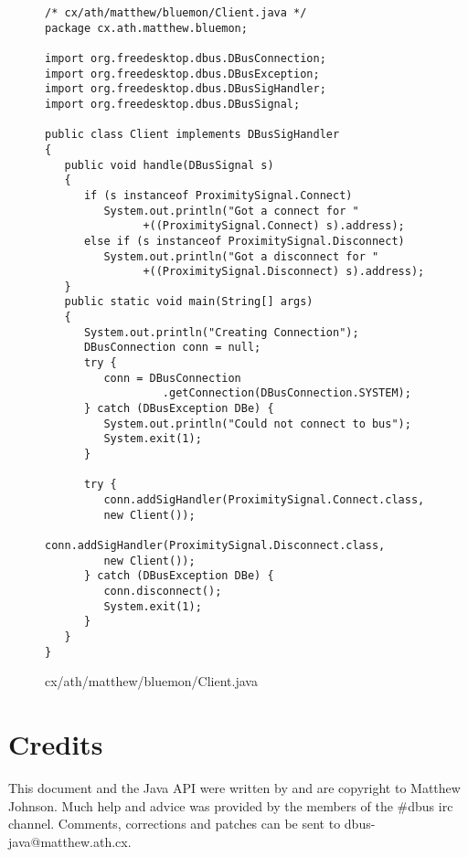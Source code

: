 \documentclass[a4paper,12pt]{article}
\begin{document}
\begin{figure}[!h]
\begin{center}
\begin{verbatim}
/* cx/ath/matthew/bluemon/Client.java */
package cx.ath.matthew.bluemon;

import org.freedesktop.dbus.DBusConnection;
import org.freedesktop.dbus.DBusException;
import org.freedesktop.dbus.DBusSigHandler;
import org.freedesktop.dbus.DBusSignal;

public class Client implements DBusSigHandler
{
   public void handle(DBusSignal s)
   {
      if (s instanceof ProximitySignal.Connect)
         System.out.println("Got a connect for "
               +((ProximitySignal.Connect) s).address);
      else if (s instanceof ProximitySignal.Disconnect)
         System.out.println("Got a disconnect for "
               +((ProximitySignal.Disconnect) s).address);
   }
   public static void main(String[] args) 
   {
      System.out.println("Creating Connection");
      DBusConnection conn = null;
      try {
         conn = DBusConnection
                  .getConnection(DBusConnection.SYSTEM);
      } catch (DBusException DBe) {
         System.out.println("Could not connect to bus");
         System.exit(1);
      }
      
      try {
         conn.addSigHandler(ProximitySignal.Connect.class, 
         new Client());
         conn.addSigHandler(ProximitySignal.Disconnect.class, 
         new Client());
      } catch (DBusException DBe) {
         conn.disconnect();
         System.exit(1);
      }
   }
}
\end{verbatim}
\end{center}
\caption{cx/ath/matthew/bluemon/Client.java}
\end{figure}

\newpage

\section{Credits}

This document and the Java API were written by and are copyright to
Matthew Johnson. Much help and advice was provided by the members of
the \#dbus irc channel. Comments, corrections and patches can be sent
to dbus-java@matthew.ath.cx.
\end{document}
